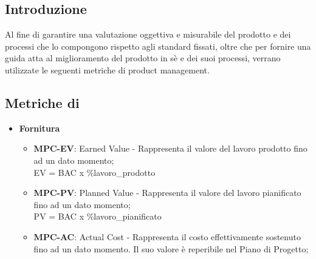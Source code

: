 \subsection{Introduzione}
Al fine di garantire una valutazione oggettiva e misurabile del prodotto e dei processi che lo compongono rispetto agli standard fissati, oltre che per fornire una guida atta al miglioramento del prodotto in sè e dei suoi processi, verrano utilizzate le seguenti metriche di product management. 

\subsection{Metriche di }
\begin{itemize}
    \item \textbf{Fornitura}
        \begin{itemize}
            \item \textbf{MPC-EV}: Earned Value - Rappresenta il valore del lavoro prodotto fino ad un dato momento;\\
                EV = BAC x \%lavoro\_prodotto\\  
            \item \textbf{MPC-PV}: Planned Value - Rappresenta il valore del lavoro pianificato fino ad un dato momento;\\
                PV = BAC x \%lavoro\_pianificato\\
            \item \textbf{MPC-AC}: Actual Cost - Rappresenta il costo effettivamente sostenuto fino ad un dato momento. Il suo valore è reperibile nel Piano di Progetto;\\


\end{itemize}
\end{itemize}
